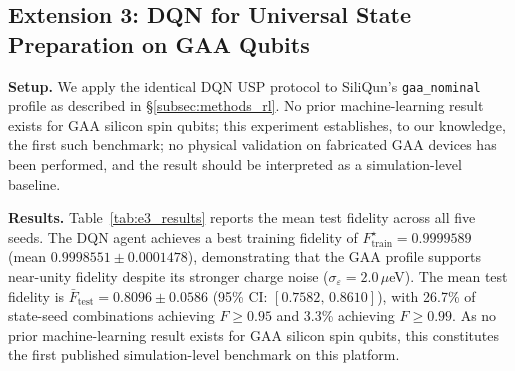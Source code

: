 \subsection{Extension 3: DQN for Universal State Preparation on GAA Qubits}
\label{subsec:e3_results}

\textbf{Setup.} We apply the identical DQN USP protocol to SiliQun's
\texttt{gaa\_nominal} profile as described in \S\ref{subsec:methods_rl}.
No prior machine-learning result exists for GAA silicon spin qubits;
this experiment establishes, to our knowledge, the first such benchmark; no physical validation on fabricated GAA devices has been performed, and the result should be interpreted as a simulation-level baseline.

\textbf{Results.} Table~\ref{tab:e3_results} reports the mean test
fidelity across all five seeds.
The DQN agent achieves a best training fidelity of $F_\text{train}^\star = 0.9999589$
(mean $0.9998551 \pm 0.0001478$), demonstrating that the GAA profile supports
near-unity fidelity despite its stronger charge noise ($\sigma_\varepsilon = 2.0$\,$\mu$eV).
The mean test fidelity is $\bar{F}_\text{test} = 0.8096 \pm 0.0586$
(95\% CI: $[0.7582,\,0.8610]$), with 26.7\% of state-seed combinations
achieving $F \geq 0.95$ and 3.3\% achieving $F \geq 0.99$.
As no prior machine-learning result exists for GAA silicon spin qubits,
this constitutes the first published simulation-level benchmark on this platform.

